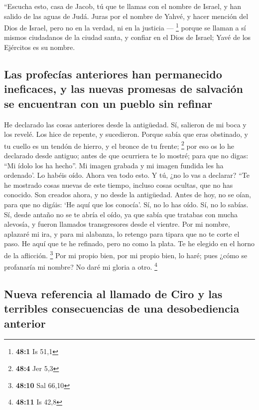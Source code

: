  ``Escucha esto, casa de Jacob, tú que te llamas con el
nombre de Israel, y han salido de las aguas de Judá. Juras por el nombre
de Yahvé, y hacer mención del Dios de Israel, pero no en la verdad, ni
en la justicia --- \footnote{\textbf{48:1} Is 51,1} 
porque se llaman a sí mismos ciudadanos de la ciudad santa, y confiar en
el Dios de Israel; Yavé de los Ejércitos es su nombre.

\hypertarget{las-profecuxedas-anteriores-han-permanecido-ineficaces-y-las-nuevas-promesas-de-salvaciuxf3n-se-encuentran-con-un-pueblo-sin-refinar}{%
\subsection{Las profecías anteriores han permanecido ineficaces, y las
nuevas promesas de salvación se encuentran con un pueblo sin
refinar}\label{las-profecuxedas-anteriores-han-permanecido-ineficaces-y-las-nuevas-promesas-de-salvaciuxf3n-se-encuentran-con-un-pueblo-sin-refinar}}

 He declarado las cosas anteriores desde la antigüedad.
Sí, salieron de mi boca y los revelé. Los hice de repente, y sucedieron.
 Porque sabía que eras obstinado, y tu cuello es un tendón
de hierro, y el bronce de tu frente; \footnote{\textbf{48:4} Jer 5,3}
 por eso os lo he declarado desde antiguo; antes de que
ocurriera te lo mostré; para que no digas: ``Mi ídolo los ha hecho''. Mi
imagen grabada y mi imagen fundida les ha ordenado'.  Lo
habéis oído. Ahora vea todo esto. Y tú, ¿no lo vas a declarar? ``Te he
mostrado cosas nuevas de este tiempo, incluso cosas ocultas, que no has
conocido.  Son creados ahora, y no desde la antigüedad.
Antes de hoy, no se oían, para que no digáis: `He aquí que los conocía'.
 Sí, no lo has oído. Sí, no lo sabías. Sí, desde antaño no
se te abría el oído, ya que sabía que tratabas con mucha alevosía, y
fueron llamados transgresores desde el vientre.  Por mi
nombre, aplazaré mi ira, y para mi alabanza, lo retengo para tipara que
no te corte el paso.  He aquí que te he refinado, pero no
como la plata. Te he elegido en el horno de la aflicción. \footnote{\textbf{48:10}
  Sal 66,10}  Por mi propio bien, por mi propio bien, lo
haré; pues ¿cómo se profanaría mi nombre? No daré mi gloria a otro.
\footnote{\textbf{48:11} Is 42,8}

\hypertarget{nueva-referencia-al-llamado-de-ciro-y-las-terribles-consecuencias-de-una-desobediencia-anterior}{%
\subsection{Nueva referencia al llamado de Ciro y las terribles
consecuencias de una desobediencia
anterior}\label{nueva-referencia-al-llamado-de-ciro-y-las-terribles-consecuencias-de-una-desobediencia-anterior}}

